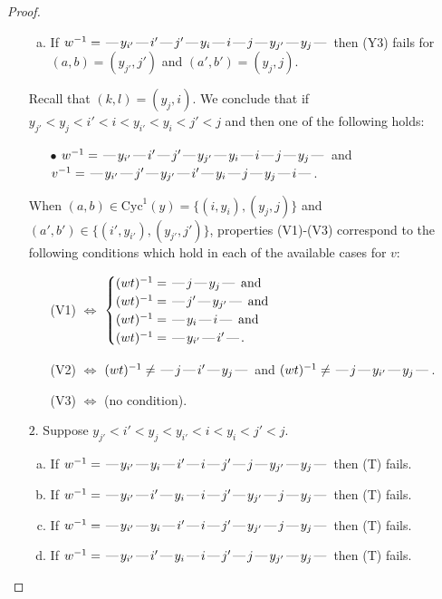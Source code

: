 \documentclass[10pt]{article}
\theoremstyle{definition}
\theoremstyle{definition}
\def\dash{\text{\hspace{0.5mm}---\hspace{0.5mm}}}
\def\Cyc{\mathrm{Cyc}}
\begin{document}
\begin{proof}
\begin{enumerate}
\begin{enumerate}[(a)]
\item If $w^{-1} = \dash y_{i'}\dash i'\dash j'\dash y_i\dash i\dash j\dash y_{j'}\dash y_j\dash $ then (Y3) fails for $(a,b)=(y_{j'},j')$ and $(a',b')=(y_j,j)$.
\end{enumerate}
Recall that $(k,l) = (y_j,i)$.
We conclude that if $y_{j'} < y_j < i' < i < y_{i'} < y_i < j' < j$ and then one of the following holds:
\begin{enumerate}
\item[$\bullet$] $w^{-1} = \dash y_{i'}\dash i'\dash j'\dash y_{j'}\dash y_i\dash i\dash j\dash y_j\dash $ and $v^{-1} = \dash y_{i'}\dash j'\dash y_{j'}\dash i'\dash y_i\dash j\dash y_j\dash i\dash $.
\end{enumerate}
When $(a,b)\in\Cyc^1(y)=\{(i,y_i),(y_j,j)\}$ and $(a',b')\in\{(i',y_{i'}),(y_{j'},j')\}$,
properties (V1)-(V3) correspond to the following conditions which hold in
each of the available cases for $v$:
\begin{enumerate}
\item[](V1) $\Leftrightarrow$ $\begin{cases}\text{$(wt)^{-1} = \dash j \dash y_j \dash$}\text{ and }\\
\text{$(wt)^{-1} = \dash j' \dash y_{j'} \dash$}\text{ and }\\
\text{$(wt)^{-1} = \dash y_i \dash i \dash$}\text{ and }\\
\text{$(wt)^{-1} = \dash y_{i'} \dash i' \dash$}.\end{cases}$
\item[](V2) $\Leftrightarrow$ $(wt)^{-1} \neq \dash j \dash i' \dash y_j \dash$ and $(wt)^{-1}\neq \dash j \dash y_{i'} \dash y_j \dash$.
\item[](V3) $\Leftrightarrow$ (no condition).
\end{enumerate}
\item[$2$.] Suppose $y_{j'} < i' < y_j < y_{i'} < i < y_i < j' < j$.
\begin{enumerate}[(a)]
\item If $w^{-1} = \dash y_{i'}\dash y_i\dash i'\dash i\dash j'\dash j\dash y_{j'}\dash y_j\dash $ then (T) fails.
\item If $w^{-1} = \dash y_{i'}\dash i'\dash y_i\dash i\dash j'\dash y_{j'}\dash j\dash y_j\dash $ then (T) fails.
\item If $w^{-1} = \dash y_{i'}\dash y_i\dash i'\dash i\dash j'\dash y_{j'}\dash j\dash y_j\dash $ then (T) fails.
\item If $w^{-1} = \dash y_{i'}\dash i'\dash y_i\dash i\dash j'\dash j\dash y_{j'}\dash y_j\dash $ then (T) fails.

\end{enumerate}
\end{enumerate}
\end{proof}
\end{document}
